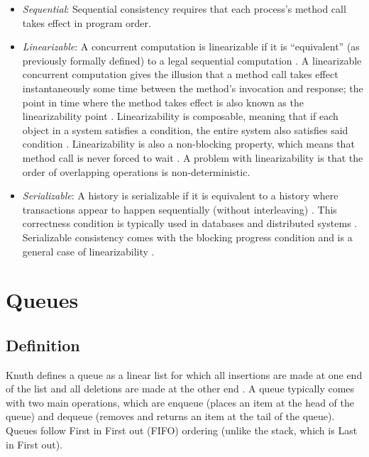 \begin{itemize}
\item \emph{Sequential}: Sequential consistency requires that each process's method call takes effect in program order.
\item \emph{Linearizable}: A concurrent computation is linearizable if it is ``equivalent'' (as previously formally defined) to a legal sequential computation \cite{herlihy1990linearizability}. A linearizable concurrent computation gives the illusion that a method call takes effect instantaneously some time between the method's invocation and response; the point in time where the method takes effect is also known as the linearizability point \cite{herlihy2020art,herlihy1990linearizability}. Linearizability is composable, meaning that if each object in a system satisfies a condition, the entire system also satisfies said condition \cite[Chapter~3.3.1]{herlihy2020art}. Linearizability is also a non-blocking property, which means that method call is never forced to wait \cite{herlihy1990linearizability}. A problem with linearizability is that the order of overlapping operations is non-deterministic.
\item \emph{Serializable}: A history is serializable if it is equivalent to a history where transactions appear to happen sequentially (without interleaving) \cite[Section~3.3]{herlihy1990linearizability}. This correctness condition is typically used in databases and distributed systems \cite{guerraoui2019consensus}. Serializable consistency comes with the blocking progress condition and is a general case of linearizability \cite{herlihy1990linearizability}.
\end{itemize}

\section{Queues}
\subsection{Definition}
Knuth defines a queue as a linear list for which all insertions are made at one end of the list and all deletions are made at the other end \cite{knuth1968art}. A queue typically comes with two main operations, which are enqueue (places an item at the head of the queue) and dequeue (removes and returns an item at the tail of the queue). Queues follow First in First out (FIFO) ordering (unlike the stack, which is Last in First out).
